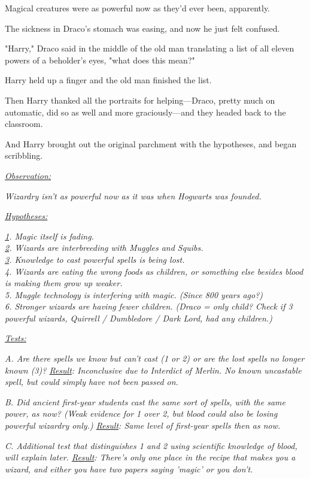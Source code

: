 Magical creatures were as powerful now as they'd ever been, apparently.

The sickness in Draco's stomach was easing, and now he just felt confused.

"Harry," Draco said in the middle of the old man translating a list of all 
eleven powers of a beholder's eyes, "what does this mean?"

Harry held up a finger and the old man finished the list.

Then Harry thanked all the portraits for helping---Draco, pretty much on 
automatic, did so as well and more graciously---and they headed back to the 
classroom.

And Harry brought out the original parchment with the hypotheses, and began 
scribbling.

\emph{\underline{Observation:}}

\emph{Wizardry isn't as powerful now as it was when Hogwarts was founded.}

\emph{\underline{Hypotheses:}}

\emph{\underline{1}. Magic itself is fading.\\
\underline{2}. Wizards are interbreeding with Muggles and Squibs.\\
\underline{3}. Knowledge to cast powerful spells is being lost.\\
4. Wizards are eating the wrong foods as children, or something else besides 
blood is making them grow up weaker.\\
5. Muggle technology is interfering with magic. (Since 800 years ago?)\\
6. Stronger wizards are having fewer children. (Draco = only child? Check if 3 
powerful wizards, Quirrell / Dumbledore / Dark Lord, had any children.)}

\emph{\underline{Tests:}}

\emph{A. Are there spells we know but can't cast (1 or 2) or are the lost 
spells no longer known (3)? \underline{Result}: Inconclusive due to Interdict 
of Merlin. No known uncastable spell, but could simply have not been passed on.}

\emph{B. Did ancient first-year students cast the same sort of spells, with the 
same power, as now? (Weak evidence for 1 over 2, but blood could also be losing 
powerful wizardry only.) \underline{Result}: Same level of first-year spells 
then as now.}

\emph{C. Additional test that distinguishes 1 and 2 using scientific knowledge 
of blood, will explain later. \underline{Result}: There's only one place in the 
recipe that makes you a wizard, and either you have two papers saying 'magic' 
or you don't.}

